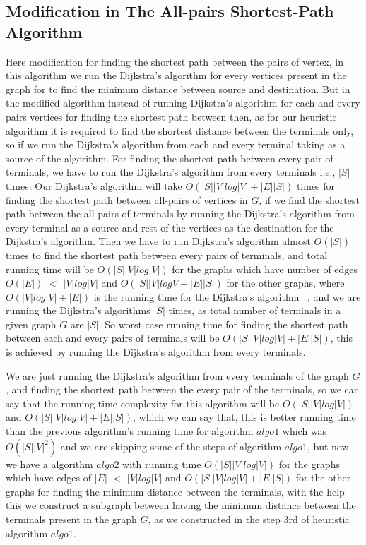 \subsection{Modification in The All-pairs Shortest-Path Algorithm}
Here modification for finding the shortest path between the pairs of vertex, in this algorithm we run the Dijkstra's algorithm for every vertices present in the graph for to find the minimum distance between source and destination. But in the modified algorithm instead of running Dijkstra's algorithm for each and every pairs vertices for finding the shortest path between then, as for our heuristic algorithm it is required to find the shortest distance between the terminals only, so if we run the Dijkstra's algorithm from each and every terminal taking as a source of the algorithm. For finding the shortest path between every pair of terminals, we have to run the Dijkstra's algorithm from every terminals i.e., $|S|$ times. Our Dijkstra's algorithm will take $O(|S||V|log|V| + |E||S|)$ times for finding the shortest path between all-pairs of vertices in $G$, if we find the shortest path between the all pairs of terminals by running the Dijkstra's algorithm from every terminal as a source and rest of the vertices as the destination for the Dijkstra's algorithm. Then we have to run Dijkstra's algorithm almost $O(|S|)$ times to find the shortest path between every pairs of terminals, and total running time will be $O(|S||V|log|V|)$ for the graphs which have number of edges $O(|E|)$ $<$ $|V|log|V|$ and $O(|S||V|logV + |E||S|)$ for the other graphs, where $O(|V|log|V| + |E|)$ is the running time for the Dijkstra's algorithm ~\cite{dijktra}, and we are running the Dijkstra's algorithms $|S|$ times, as total number of terminals in a given graph $G$ are $|S|$. So worst case running time for finding the shortest path between each and every pairs of terminals will be $O(|S||V|log|V| + |E||S|)$, this is achieved by running the Dijkstra's algorithm from every terminals.

We are just running the Dijkstra's algorithm from every terminals of the graph $G$, and finding the shortest path between the every pair of the terminals, so we can say that the running time complexity for this algorithm will be $O(|S||V|log|V|)$ and $O(|S||V|log|V| + |E||S|)$, which we can say that, this is better running time than the previous algorithm's running time for algorithm $algo1$ which was $O(|S||V|^2)$ and we are skipping some of the steps of algorithm $algo1$, but now we have a algorithm $algo2$ with running time $O(|S||V|log|V|)$ for the graphs which have edges of $|E|$ $<$ $|V|log|V|$ and $O(|S||V|log|V| + |E||S|)$ for the other graphs for finding the minimum distance between the terminals, with the help this we construct a subgraph between having the minimum distance between the terminals present in the graph $G$, as we constructed in the step 3rd of heuristic algorithm $algo1$. 

